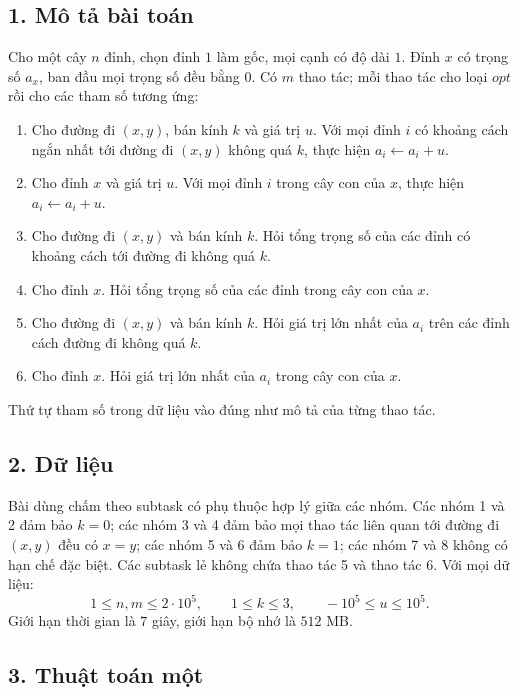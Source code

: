 \documentclass[11pt]{article}
\begin{document}
\subsection*{1. Mô tả bài toán}

Cho một cây \(n\) đỉnh, chọn đỉnh \(1\) làm gốc, mọi cạnh có độ dài \(1\). Đỉnh
\(x\) có trọng số \(a_x\), ban đầu mọi trọng số đều bằng \(0\). Có \(m\) thao
tác; mỗi thao tác cho loại \(opt\) rồi cho các tham số tương ứng:
\begin{enumerate}
  \item Cho đường đi \((x,y)\), bán kính \(k\) và giá trị \(u\). Với mọi đỉnh
  \(i\) có khoảng cách ngắn nhất tới đường đi \((x,y)\) không quá \(k\), thực
  hiện \(a_i\leftarrow a_i+u\).
  \item Cho đỉnh \(x\) và giá trị \(u\). Với mọi đỉnh \(i\) trong cây con của
  \(x\), thực hiện \(a_i\leftarrow a_i+u\).
  \item Cho đường đi \((x,y)\) và bán kính \(k\). Hỏi tổng trọng số của các
  đỉnh có khoảng cách tới đường đi không quá \(k\).
  \item Cho đỉnh \(x\). Hỏi tổng trọng số của các đỉnh trong cây con của \(x\).
  \item Cho đường đi \((x,y)\) và bán kính \(k\). Hỏi giá trị lớn nhất của
  \(a_i\) trên các đỉnh cách đường đi không quá \(k\).
  \item Cho đỉnh \(x\). Hỏi giá trị lớn nhất của \(a_i\) trong cây con của
  \(x\).
\end{enumerate}
Thứ tự tham số trong dữ liệu vào đúng như mô tả của từng thao tác.

\subsection*{2. Dữ liệu}

Bài dùng chấm theo subtask có phụ thuộc hợp lý giữa các nhóm. Các nhóm 1 và 2
đảm bảo \(k=0\); các nhóm 3 và 4 đảm bảo mọi thao tác liên quan tới đường đi
\((x,y)\) đều có \(x=y\); các nhóm 5 và 6 đảm bảo \(k=1\); các nhóm 7 và 8
không có hạn chế đặc biệt. Các subtask lẻ không chứa thao tác 5 và thao tác 6.
Với mọi dữ liệu:
\[
  1\le n,m\le 2\cdot 10^5,\qquad 1\le k\le 3,\qquad -10^5\le u\le 10^5.
\]
Giới hạn thời gian là \(7\) giây, giới hạn bộ nhớ là \(512\) MB.

\subsection*{3. Thuật toán một}
\end{document}
